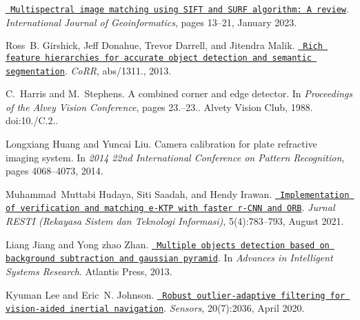 \begin{DoxyDescription}
\item[\label{citelist_CITEREF_geo23}%
\Hypertarget{citelist_CITEREF_geo23}%
\mbox{[}8\mbox{]}]\href{https://doi.org/10.52939/ijg.v19i1.2495}{\texttt{ Multispectral image matching using SIFT and SURF algorithm\+: A review}}. {\itshape International Journal of Geoinformatics}, pages 13--21, January 2023. 


\item[\label{citelist_CITEREF_ross13}%
\Hypertarget{citelist_CITEREF_ross13}%
\mbox{[}9\mbox{]}]Ross~B. Girshick, Jeff Donahue, Trevor Darrell, and Jitendra Malik. \href{http://arxiv.org/abs/1311.2524}{\texttt{ Rich feature hierarchies for accurate object detection and semantic segmentation}}. {\itshape Co\+RR}, abs/1311., 2013.


\item[\label{citelist_CITEREF_harris1988}%
\Hypertarget{citelist_CITEREF_harris1988}%
\mbox{[}10\mbox{]}]C.~Harris and M.~Stephens. A combined corner and edge detector. In {\itshape Proceedings of the Alvey Vision Conference}, pages 23.--23.. Alvety Vision Club, 1988. doi\+:10./C.2..


\item[\label{citelist_CITEREF_Huang14}%
\Hypertarget{citelist_CITEREF_Huang14}%
\mbox{[}11\mbox{]}]Longxiang Huang and Yuncai Liu. Camera calibration for plate refractive imaging system. In {\itshape 2014 22nd International Conference on Pattern Recognition}, pages 4068--4073, 2014. 


\item[\label{citelist_CITEREF_Hudaya21}%
\Hypertarget{citelist_CITEREF_Hudaya21}%
\mbox{[}12\mbox{]}]Muhammad~Muttabi Hudaya, Siti Saadah, and Hendy Irawan. \href{https://doi.org/10.29207/resti.v5i4.3175}{\texttt{ Implementation of verification and matching e-\/\+KTP with faster r-\/\+CNN and ORB}}. {\itshape Jurnal RESTI (Rekayasa Sistem dan Teknologi Informasi)}, 5(4)\+:783--793, August 2021. 


\item[\label{citelist_CITEREF_Jiang13}%
\Hypertarget{citelist_CITEREF_Jiang13}%
\mbox{[}13\mbox{]}]Liang Jiang and Yong zhao Zhan. \href{https://doi.org/10.2991/wiet-13.2013.30}{\texttt{ Multiple objects detection based on background subtraction and gaussian pyramid}}. In {\itshape Advances in Intelligent Systems Research}. Atlantis Press, 2013. 


\item[\label{citelist_CITEREF_Lee20}%
\Hypertarget{citelist_CITEREF_Lee20}%
\mbox{[}14\mbox{]}]Kyuman Lee and Eric~N. Johnson. \href{https://doi.org/10.3390/s20072036}{\texttt{ Robust outlier-\/adaptive filtering for vision-\/aided inertial navigation}}. {\itshape Sensors}, 20(7)\+:2036, April 2020. 



\end{DoxyDescription}
